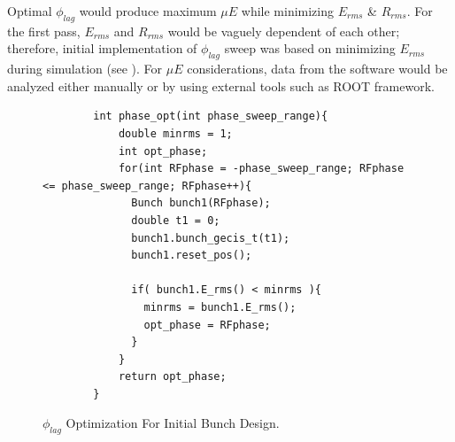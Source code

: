 \documentclass[a4paper,oneside,12pt]{report}
\numberwithin{equation}{chapter}
\begin{document}
Optimal $\phi_{lag}$ would produce maximum $\mu E$ while minimizing $E_{rms}$ \& $R_{rms}$. For the first pass, 
$E_{rms}$ and $R_{rms}$ would be vaguely dependent of each other; therefore, initial implementation of $\phi_{lag}$ sweep was based on minimizing $E_{rms}$ during simulation (see ). 
For $\mu E$ considerations, data from the software would be analyzed either manually or by using external tools such as ROOT framework. 
\vspace{20pt}
\begin{figure}[H]
    \centering
    \begin{verbatim}
        int phase_opt(int phase_sweep_range){
            double minrms = 1;
            int opt_phase;
            for(int RFphase = -phase_sweep_range; RFphase <= phase_sweep_range; RFphase++){
              Bunch bunch1(RFphase);
              double t1 = 0;
              bunch1.bunch_gecis_t(t1);
              bunch1.reset_pos();
        
              if( bunch1.E_rms() < minrms ){
                minrms = bunch1.E_rms();
                opt_phase = RFphase;
              }
            }
            return opt_phase;
        }
    \end{verbatim}
    \vspace{-3pt}
    \caption{$\phi_{lag}$ Optimization For Initial Bunch Design.}
    \label{fig:phlag_opt}
\end{figure}
\end{document}
